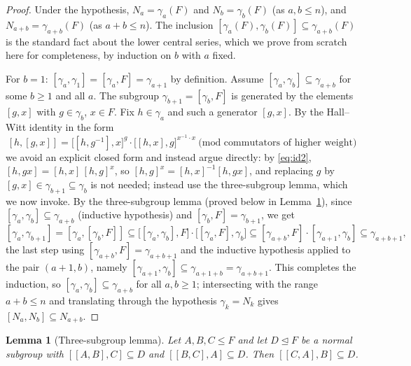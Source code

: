 \documentclass{amsart}
\newtheorem{lemma}{Lemma}
\theoremstyle{definition}
\theoremstyle{remark}
\begin{document}
\begin{proof}
Under the hypothesis, $N_a=\gamma_a(F)$ and $N_b=\gamma_b(F)$ (as $a,b\le n$), and
$N_{a+b}=\gamma_{a+b}(F)$ (as $a+b\le n$). The inclusion $[\gamma_a(F),
\gamma_b(F)]\subseteq\gamma_{a+b}(F)$ is the standard fact about the lower central
series, which we prove from scratch here for completeness, by induction on $b$ with
$a$ fixed.

For $b=1$: $[\gamma_a,\gamma_1]=[\gamma_a,F]=\gamma_{a+1}$ by definition. Assume
$[\gamma_a,\gamma_b]\subseteq\gamma_{a+b}$ for some $b\ge1$ and all $a$. The
subgroup $\gamma_{b+1}=[\gamma_b,F]$ is generated by the elements $[g,x]$ with
$g\in\gamma_b$, $x\in F$. Fix $h\in\gamma_a$ and such a generator $[g,x]$. By the
Hall--Witt identity in the form
\[
[h,[g,x]]
=\big[[h,g^{-1}],x\big]^{g}\cdot\big[[h,x],g\big]^{x^{-1}\cdot x}\ \text{(mod commutators of higher weight)}
\]
we avoid an explicit closed form and instead argue directly: by \eqref{eq:id2},
$[h,gx]=[h,x]\,[h,g]^{x}$, so $[h,g]^{x}=[h,x]^{-1}[h,gx]$, and replacing $g$ by
$[g,x]\in\gamma_{b+1}\subseteq\gamma_b$ is not needed; instead use the three-subgroup
lemma, which we now invoke. By the three-subgroup lemma (proved below in
Lemma~\ref{lem:three}), since $[\gamma_a,\gamma_b]\subseteq\gamma_{a+b}$ (inductive
hypothesis) and $[\gamma_b,F]=\gamma_{b+1}$, we get
\[
[\gamma_a,\gamma_{b+1}]=[\gamma_a,[\gamma_b,F]]
\subseteq\big[[\gamma_a,\gamma_b],F\big]\cdot\big[[\gamma_a,F],\gamma_b\big]
\subseteq[\gamma_{a+b},F]\cdot[\gamma_{a+1},\gamma_b]
\subseteq\gamma_{a+b+1},
\]
the last step using $[\gamma_{a+b},F]=\gamma_{a+b+1}$ and the inductive hypothesis
applied to the pair $(a+1,b)$, namely $[\gamma_{a+1},\gamma_b]\subseteq
\gamma_{a+1+b}=\gamma_{a+b+1}$. This completes the induction, so
$[\gamma_a,\gamma_b]\subseteq\gamma_{a+b}$ for all $a,b\ge1$; intersecting with the
range $a+b\le n$ and translating through the hypothesis $\gamma_k=N_k$ gives
$[N_a,N_b]\subseteq N_{a+b}$.
\end{proof}

\begin{lemma}[Three-subgroup lemma]\label{lem:three}
Let $A,B,C\le F$ and let $D\trianglelefteq F$ be a normal subgroup with
$[[A,B],C]\subseteq D$ and $[[B,C],A]\subseteq D$. Then $[[C,A],B]\subseteq D$.
\end{lemma}
\end{document}
